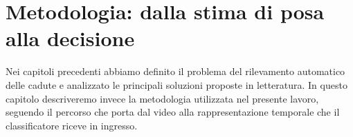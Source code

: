 %
%
%
%
%
%
%
%
%

\chapter{Metodologia: dalla stima di posa alla decisione}
\label{cap:metodologia}

Nei capitoli precedenti abbiamo definito il problema del rilevamento automatico delle cadute e analizzato le principali soluzioni proposte in letteratura. In questo capitolo descriveremo invece la metodologia utilizzata nel presente lavoro, seguendo il percorso che porta dal video alla rappresentazione temporale che il classificatore riceve in ingresso.

